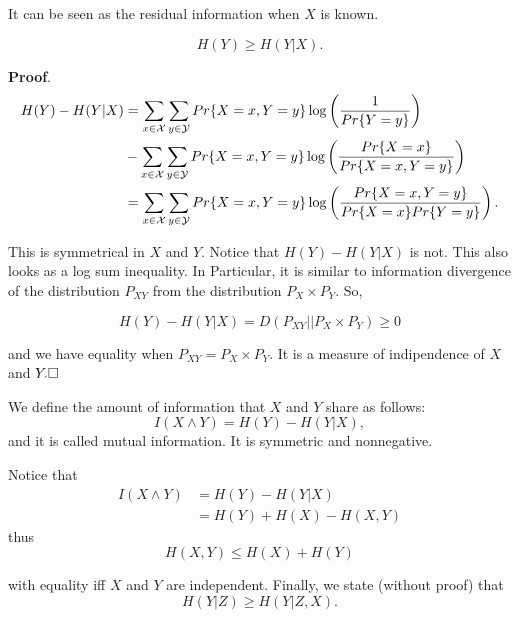 It can be seen as the residual information when $X$ is known.

\begin{prop}
\begin{equation}
H(Y) \geq H(Y|X). 
\end{equation}
\end{prop}

\noindent\textbf{Proof}. 
\begin{align*}
 H(Y) - H(Y|X) & = \sum_{x \in \mathcal{X}} \sum_{y \in \mathcal{Y}}Pr\{X=x, Y=y\}\log\left(\dfrac{1}{Pr\{Y=y\}}\right)\\ 
 & - \sum_{x \in \mathcal{X}}\sum_{y \in \mathcal{Y}} Pr\{X=x, Y=y\}\log\left(\dfrac{Pr\{X=x\}}{Pr\{X=x, Y=y\}}\right)\\
  & =  \sum_{x\in \mathcal{X}} \sum_{y \in \mathcal{Y}} Pr\{X=x, Y=y\}\log\left(\dfrac{Pr\{X=x, Y=y\}}{Pr\{X=x\}Pr\{Y=y\}}\right). 
\end{align*}



This is symmetrical in $X$ and $Y$. Notice that $H(Y) - H(Y|X)$ is not. This also looks as a log sum inequality. In Particular, it is similar to information divergence of the distribution $P_{XY}$ from the distribution $P_X \times P_Y$. So,

\begin{equation}
 H(Y) - H(Y|X) = D(P_{XY}||P_X \times P_Y) \geq 0 
\end{equation}


and we have equality when $P_{XY} = P_X \times P_Y$. It is a measure of indipendence of $X$ and $Y. \hfill\Box$
\begin{definition}
We define the amount of information that $X$ and $Y$ share as follows:
\begin{equation}
I(X \wedge Y) = H(Y) - H(Y|X), 
\end{equation}
and it is called mutual information. It is symmetric and nonnegative. 
\end{definition}

Notice that
\begin{align*}
 I(X \wedge Y) &= H(Y) - H(Y|X) \\&= H(Y) + H(X) - H(X, Y) 
\end{align*}
thus
\begin{equation}
 H(X, Y) \leq H(X) + H(Y) 
\end{equation}

with equality iff $X$ and $Y$ are independent. Finally, we state (without proof) that
\begin{equation}
 H(Y|Z) \geq H(Y |Z, X). 
\end{equation}

